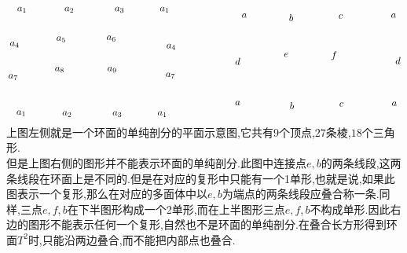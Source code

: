 \documentclass{article}
\begin{document}
\begin{example}
\[\begin{tikzpicture}[x=0.75pt,y=0.75pt,yscale=-1,xscale=1]
    \draw (43,95.4) node [anchor=north west][inner sep=0.75pt]    {$a_{1}$};
    \draw (107,95.4) node [anchor=north west][inner sep=0.75pt]    {$a_{2}$};
    \draw (175,95.4) node [anchor=north west][inner sep=0.75pt]    {$a_{3}$};
    \draw (236,95.4) node [anchor=north west][inner sep=0.75pt]    {$a_{1}$};
    \draw (42,235.4) node [anchor=north west][inner sep=0.75pt]    {$a_{1}$};
    \draw (33,142.4) node [anchor=north west][inner sep=0.75pt]    {$a_{4}$};
    \draw (96,135.4) node [anchor=north west][inner sep=0.75pt]    {$a_{5}$};
    \draw (164,134.4) node [anchor=north west][inner sep=0.75pt]    {$a_{6}$};
    \draw (245,145.4) node [anchor=north west][inner sep=0.75pt]    {$a_{4}$};
    \draw (31,186.4) node [anchor=north west][inner sep=0.75pt]    {$a_{7}$};
    \draw (94,176.4) node [anchor=north west][inner sep=0.75pt]    {$a_{8}$};
    \draw (104,236.4) node [anchor=north west][inner sep=0.75pt]    {$a_{2}$};
    \draw (172,236.4) node [anchor=north west][inner sep=0.75pt]    {$a_{3}$};
    \draw (233,236.4) node [anchor=north west][inner sep=0.75pt]    {$a_{1}$};
    \draw (165,176.4) node [anchor=north west][inner sep=0.75pt]    {$a_{9}$};
    \draw (244,184.4) node [anchor=north west][inner sep=0.75pt]    {$a_{7}$};
    \draw (347,104.4) node [anchor=north west][inner sep=0.75pt]    {$a$};
    \draw (411,105.4) node [anchor=north west][inner sep=0.75pt]    {$b$};
    \draw (478,105.4) node [anchor=north west][inner sep=0.75pt]    {$c$};
    \draw (338,164.4) node [anchor=north west][inner sep=0.75pt]    {$d$};
    \draw (549,104.4) node [anchor=north west][inner sep=0.75pt]    {$a$};
    \draw (404,157.4) node [anchor=north west][inner sep=0.75pt]    {$e$};
    \draw (468,155.4) node [anchor=north west][inner sep=0.75pt]    {$f$};
    \draw (555,163.4) node [anchor=north west][inner sep=0.75pt]    {$d$};
    \draw (338,222.4) node [anchor=north west][inner sep=0.75pt]    {$a$};
    \draw (412,224.4) node [anchor=north west][inner sep=0.75pt]    {$b$};
    \draw (479,224.4) node [anchor=north west][inner sep=0.75pt]    {$c$};
    \draw (550,223.4) node [anchor=north west][inner sep=0.75pt]    {$a$};
    
    
    \end{tikzpicture}\]
    上图左侧就是一个环面的单纯剖分的平面示意图,它共有$9$个顶点,$27$条棱,$18$个三角形.\\
    但是上图右侧的图形并不能表示环面的单纯剖分.此图中连接点$e,b$的两条线段,这两条线段在环面上是不同的.但是在对应的复形中只能有一个1单形,也就是说,如果此图表示一个复形,那么在对应的多面体中以$e,b$为端点的两条线段应叠合称一条.同样,三点$e,f,b$在下半图形构成一个2单形,而在上半图形三点$e,f,b$不构成单形.因此右边的图形不能表示任何一个复形,自然也不是环面的单纯剖分.在叠合长方形得到环面$T^2$时,只能沿两边叠合,而不能把内部点也叠合.
\end{example}
\end{document}
